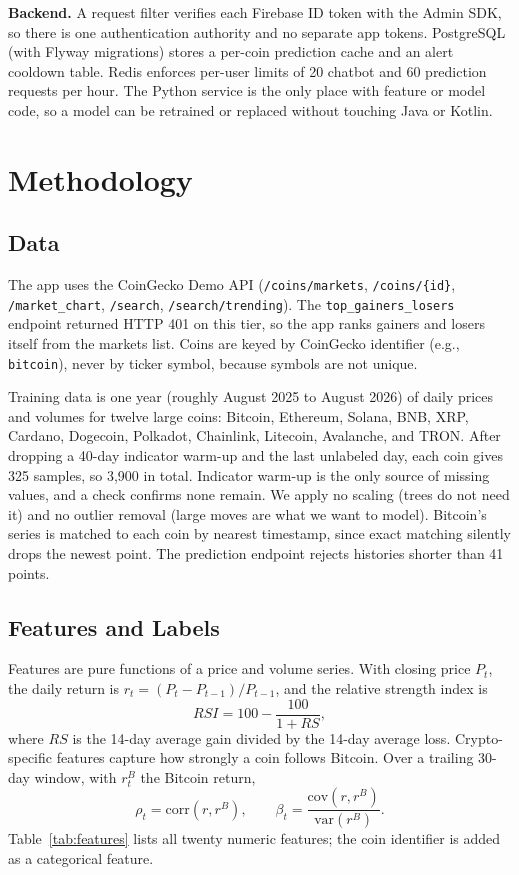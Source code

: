 \documentclass[conference]{IEEEtran}
\begin{document}
\textbf{Backend.} A request filter verifies each Firebase ID token with the Admin SDK, so there is one authentication authority and no separate app tokens. PostgreSQL (with Flyway migrations) stores a per-coin prediction cache and an alert cooldown table. Redis enforces per-user limits of 20 chatbot and 60 prediction requests per hour. The Python service is the only place with feature or model code, so a model can be retrained or replaced without touching Java or Kotlin.

\section{Methodology}

\subsection{Data}
The app uses the CoinGecko Demo API \cite{coingecko} (\texttt{/coins/markets}, \texttt{/coins/\{id\}}, \texttt{/market\_chart}, \texttt{/search}, \texttt{/search/trending}). The \texttt{top\_gainers\_losers} endpoint returned HTTP 401 on this tier, so the app ranks gainers and losers itself from the markets list. Coins are keyed by CoinGecko identifier (e.g., \texttt{bitcoin}), never by ticker symbol, because symbols are not unique.

Training data is one year (roughly August 2025 to August 2026) of daily prices and volumes for twelve large coins: Bitcoin, Ethereum, Solana, BNB, XRP, Cardano, Dogecoin, Polkadot, Chainlink, Litecoin, Avalanche, and TRON. After dropping a 40-day indicator warm-up and the last unlabeled day, each coin gives 325 samples, so 3,900 in total. Indicator warm-up is the only source of missing values, and a check confirms none remain. We apply no scaling (trees do not need it) and no outlier removal (large moves are what we want to model). Bitcoin's series is matched to each coin by nearest timestamp, since exact matching silently drops the newest point. The prediction endpoint rejects histories shorter than 41 points.

\subsection{Features and Labels}
Features are pure functions of a price and volume series. With closing price $P_t$, the daily return is $r_t=(P_t-P_{t-1})/P_{t-1}$, and the relative strength index \cite{wilder1978} is
\begin{equation}
RSI = 100 - \frac{100}{1+RS},
\end{equation}
where $RS$ is the 14-day average gain divided by the 14-day average loss. Crypto-specific features capture how strongly a coin follows Bitcoin. Over a trailing 30-day window, with $r^{B}_t$ the Bitcoin return,
\begin{equation}
\rho_t=\mathrm{corr}(r,r^{B}),\qquad
\beta_t=\frac{\mathrm{cov}(r,r^{B})}{\mathrm{var}(r^{B})}.
\end{equation}
Table~\ref{tab:features} lists all twenty numeric features; the coin identifier is added as a categorical feature.
\end{document}
